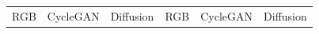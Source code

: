 \begin{figure}[htp!]
    \centering
    \begin{tabularx}{\textwidth}{>{\centering\arraybackslash}X >{\centering\arraybackslash}X >{\centering\arraybackslash}X >{\centering\arraybackslash}X >{\centering\arraybackslash}X >{\centering\arraybackslash}X}
        RGB                                                                                    & CycleGAN                                                                                         & Diffusion                                                                                    & RGB                                                                                    & CycleGAN                                                                                         & Diffusion                                                                                    \\

\end{tabularx}
\end{figure}
